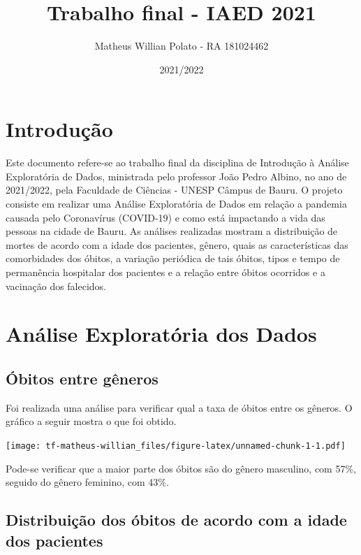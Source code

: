 \documentclass[
  brazilian,
]{article}
\title{Trabalho final - IAED 2021}
\author{Matheus Willian Polato - RA 181024462}
\date{2021/2022}
\begin{document}
\maketitle

\hypertarget{introduuxe7uxe3o}{%
\section{Introdução}\label{introduuxe7uxe3o}}

Este documento refere-se ao trabalho final da disciplina de Introdução à
Análise Exploratória de Dados, ministrada pelo professor João Pedro
Albino, no ano de 2021/2022, pela Faculdade de Ciências - UNESP Câmpus
de Bauru. O projeto consiste em realizar uma Análise Exploratória de
Dados em relação a pandemia causada pelo Coronavírus (COVID-19) e como
está impactando a vida das pessoas na cidade de Bauru. As análises
realizadas mostram a distribuição de mortes de acordo com a idade dos
pacientes, gênero, quais as características das comorbidades dos óbitos,
a variação periódica de tais óbitos, tipos e tempo de permanência
hospitalar dos pacientes e a relação entre óbitos ocorridos e a
vacinação dos falecidos.

\hypertarget{anuxe1lise-exploratuxf3ria-dos-dados}{%
\section{Análise Exploratória dos
Dados}\label{anuxe1lise-exploratuxf3ria-dos-dados}}

\hypertarget{uxf3bitos-entre-guxeaneros}{%
\subsection{Óbitos entre gêneros}\label{uxf3bitos-entre-guxeaneros}}

Foi realizada uma análise para verificar qual a taxa de óbitos entre os
gêneros. O gráfico a seguir mostra o que foi obtido.

\texttt{[image: tf-matheus-willian\_files/figure-latex/unnamed-chunk-1-1.pdf]}

Pode-se verificar que a maior parte dos óbitos são do gênero masculino,
com 57\%, seguido do gênero feminino, com 43\%.

\hypertarget{distribuiuxe7uxe3o-dos-uxf3bitos-de-acordo-com-a-idade-dos-pacientes}{%
\subsection{Distribuição dos óbitos de acordo com a idade dos
pacientes}\label{distribuiuxe7uxe3o-dos-uxf3bitos-de-acordo-com-a-idade-dos-pacientes}}
\end{document}

